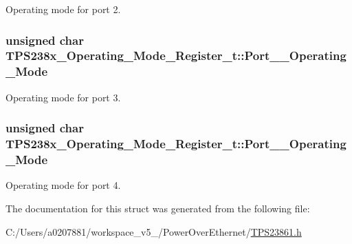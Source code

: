 Operating mode for port 2. 

\hypertarget{struct_t_p_s238x___operating___mode___register__t_a144c510b8911a36d262339244d182c38}{
\subsubsection[{Port\-\_\-3\-\_\-\-Operating\-\_\-\-Mode}]{\setlength{\rightskip}{0pt plus 5cm}unsigned char T\-P\-S238x\-\_\-\-Operating\-\_\-\-Mode\-\_\-\-Register\-\_\-t\-::\-Port\-\_\-\_\-\-Operating\-\_\-\-Mode}}\label{struct_t_p_s238x___operating___mode___register__t_a144c510b8911a36d262339244d182c38}


Operating mode for port 3. 

\hypertarget{struct_t_p_s238x___operating___mode___register__t_a8433fd46ed96047bdfb0904dd3018a11}{
\subsubsection[{Port\-\_\-4\-\_\-\-Operating\-\_\-\-Mode}]{\setlength{\rightskip}{0pt plus 5cm}unsigned char T\-P\-S238x\-\_\-\-Operating\-\_\-\-Mode\-\_\-\-Register\-\_\-t\-::\-Port\-\_\-\_\-\-Operating\-\_\-\-Mode}}\label{struct_t_p_s238x___operating___mode___register__t_a8433fd46ed96047bdfb0904dd3018a11}


Operating mode for port 4. 



The documentation for this struct was generated from the following file\-:\begin{DoxyCompactItemize}
\item 
C\-:/\-Users/a0207881/workspace\-\_\-v5\-\_/\-Power\-Over\-Ethernet/\hyperlink{_t_p_s23861_8h}{T\-P\-S23861.\-h}\end{DoxyCompactItemize}
